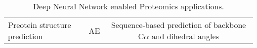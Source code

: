 \begin{table}[h!]
\centering
\begin{tabular}{||l|c|c||}
    \hline
    
    Preotein structure prediction & AE & Sequence-based prediction of backbone C$\alpha$ and dihedral angles 
    \hline
\end{tabular}
\caption{Deep Neural Network enabled Proteomics applications.}
\label{tab:PS-DNN}
\end{table}
